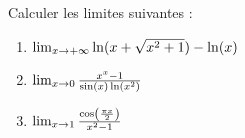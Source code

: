 \documentclass[11pt]{article}
\begin{document}
\begin{preview}

      Calculer les limites suivantes : 

\begin{enumerate}
\item $\lim_{x\rightarrow+\infty} \ln(x+\sqrt{x^2 +1}) -\ln(x)$\\

\item $\lim_{x\rightarrow 0} \frac{x^x-1}{\sin(x)\ln(x^2)}$
\item $\lim_{x\rightarrow 1} \frac{\cos\left(\frac{\pi x}{2}\right)}{x^2-1}$
\end{enumerate}
\end{preview}
\end{document}
